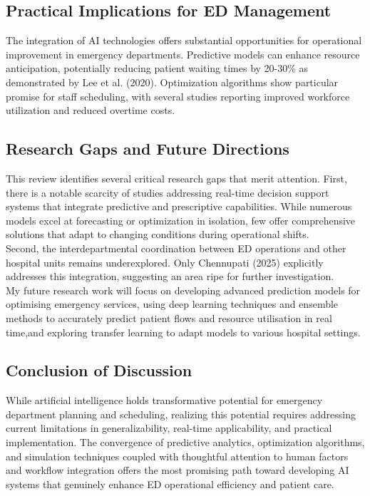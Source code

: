 \documentclass[runningheads]{llncs}
\begin{document}
\subsection{Practical Implications for ED Management}
The integration of AI technologies offers substantial opportunities for operational improvement in emergency departments. Predictive models can enhance resource anticipation, potentially reducing patient waiting times by 20-30\% as demonstrated by \cite{lee2020rl} Lee et al. (2020). Optimization algorithms show particular promise for staff scheduling, with several studies reporting improved workforce utilization and reduced overtime costs.
\subsection{Research Gaps and Future Directions}
This review identifies several critical research gaps that merit attention. First, there is a notable scarcity of studies addressing real-time decision support systems that integrate predictive and prescriptive capabilities. While numerous models excel at forecasting or optimization in isolation, few offer comprehensive solutions that adapt to changing conditions during operational shifts.\\
Second, the interdepartmental coordination between ED operations and other hospital units remains underexplored. Only \cite{chennupati2025aira} Chennupati (2025) explicitly addresses this integration, suggesting an area ripe for further investigation.\\
My future research work will focus on developing advanced prediction models for optimising emergency services, using deep learning techniques and ensemble methods to accurately predict patient flows and resource utilisation in real time,and exploring transfer learning to adapt models to various hospital settings.
\subsection{Conclusion of Discussion}
While artificial intelligence holds transformative potential for emergency department planning and scheduling, realizing this potential requires addressing current limitations in generalizability, real-time applicability, and practical implementation. The convergence of predictive analytics, optimization algorithms, and simulation techniques coupled with thoughtful attention to human factors and workflow integration offers the most promising path toward developing AI systems that genuinely enhance ED operational efficiency and patient care.
\end{document}
